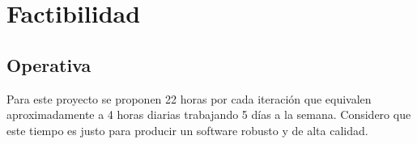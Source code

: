 %
%
%	
%
%
%
%
%
%
%
%
%
%
%
%


\section{Factibilidad}

\subsection*{Operativa}
Para este proyecto se proponen 22 horas por cada iteración que equivalen aproximadamente a 4 horas diarias trabajando 5 días a la semana. Considero que este tiempo es justo para producir un software robusto y de alta calidad.

